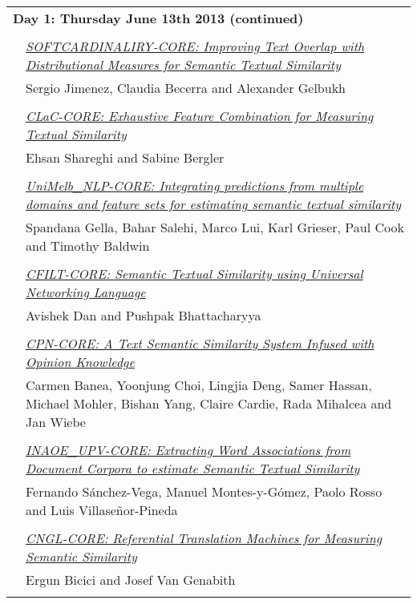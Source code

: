 \begin{tabular}{p{20mm}p{138mm}}
\\
\multicolumn{2}{l}{\bf Day 1: Thursday June 13th 2013 (continued)} \\\\
 & \hyperlink{page.194}{\em SOFTCARDINALIRY-CORE: Improving Text Overlap with Distributional Measures for Semantic Textual Similarity}\\
         & Sergio Jimenez, Claudia Becerra and Alexander Gelbukh \\
\\

 & \hyperlink{page.202}{\em CLaC-CORE: Exhaustive Feature Combination for Measuring Textual Similarity}\\
         & Ehsan Shareghi and Sabine Bergler \\
\\

 & \hyperlink{page.207}{\em UniMelb\_NLP-CORE: Integrating predictions from multiple domains and feature sets for estimating semantic textual similarity}\\
         & Spandana Gella, Bahar Salehi, Marco Lui, Karl Grieser, Paul Cook and Timothy Baldwin \\
\\

 & \hyperlink{page.216}{\em CFILT-CORE: Semantic Textual Similarity using Universal Networking Language}\\
         & Avishek Dan and Pushpak Bhattacharyya \\
\\

 & \hyperlink{page.221}{\em CPN-CORE: A Text Semantic Similarity System Infused with Opinion Knowledge}\\
         & Carmen Banea, Yoonjung Choi, Lingjia Deng, Samer Hassan, Michael Mohler, Bishan Yang, Claire Cardie, Rada Mihalcea and Jan Wiebe \\
\\

 & \hyperlink{page.229}{\em INAOE\_UPV-CORE: Extracting Word Associations from Document Corpora to estimate Semantic Textual Similarity}\\
         & Fernando S\'{a}nchez-Vega, Manuel Montes-y-G\'{o}mez, Paolo Rosso and Luis Villase\~{n}or-Pineda \\
\\

 & \hyperlink{page.234}{\em CNGL-CORE: Referential Translation Machines for Measuring Semantic Similarity}\\
         & Ergun Bicici and Josef Van Genabith \\
\\


\end{tabular}
